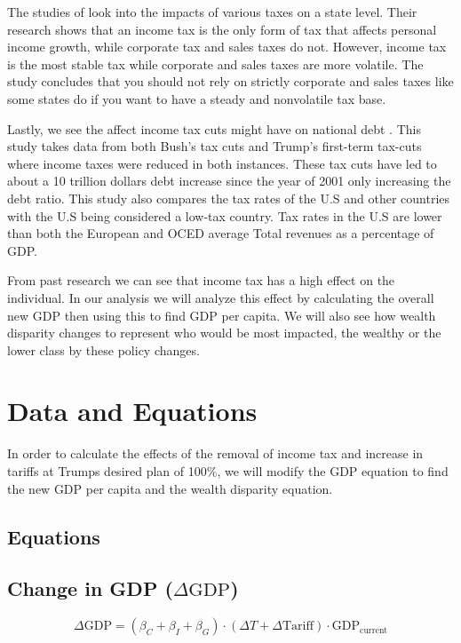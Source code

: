 \documentclass[12pt,letterpaper]{article}
\begin{document}
\indent The studies of \cite{Goss_Jacob} look into the impacts of various taxes on a state level. Their research shows that an income tax is the only form of tax that affects personal income growth, while corporate tax and sales taxes do not. However, income tax is the most stable tax while corporate and sales taxes are more volatile. The study concludes that you should not rely on strictly corporate and sales taxes like some states do if you want to have a steady and nonvolatile tax base.

\indent Lastly, we see the affect income tax cuts might have on national debt \citep{Kogan_Bobby}. This study takes data from both Bush's tax cuts and Trump's first-term tax-cuts where income taxes were reduced in both instances. These tax cuts have led to about a 10 trillion dollars debt increase since the year of 2001 only increasing the debt ratio. This study also compares the tax rates of the U.S and other countries with the U.S being considered a low-tax country. Tax rates in the U.S are lower than both the European and OCED average Total revenues as a 
percentage of GDP.

\indent From past research we can see that income tax has a high effect on the individual. In our analysis we will analyze this effect by calculating the overall new GDP then using this to find GDP per capita. We will also see how wealth disparity changes to represent who would be most impacted, the wealthy or the lower class by these policy changes.

\section{Data and Equations}

\indent In order to calculate the effects of the removal of income tax and increase in tariffs at Trumps desired plan of 100\%, we will modify the GDP equation to find the new GDP per capita and the wealth disparity equation.

\subsection{Equations}

\subsection*{Change in GDP (\( \Delta \text{GDP} \))}

\[
\Delta \text{GDP} = (\beta_C + \beta_I + \beta_G) \cdot (\Delta T + \Delta \text{Tariff}) \cdot \text{GDP}_{\text{current}}
\]
\end{document}
